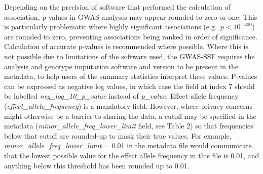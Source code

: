 \documentclass[11pt]{article}
\begin{document}
Depending on the precision of software that performed the calculation of association, p-values in GWAS analyses may appear rounded to zero or one. This is particularly problematic where highly significant associations (e.g.\ $p < 10^{-300}$) are rounded to zero, preventing associations being ranked in order of significance. Calculation of accurate p-values is recommended where possible. Where this is not possible due to limitations of the software used, the GWAS-SSF requires the analysis and genotype imputation software and version to be present in the metadata, to help users of the summary statistics interpret these values. P-values can be expressed as negative log values, in which case the field at index 7 should be labelled \textit{neg\_log\_10\_p\_value} instead of \textit{p\_value}. Effect allele frequency (\textit{effect\_allele\_frequency}) is a mandatory field. However, where privacy concerns might otherwise be a barrier to sharing the data, a cutoff may be specified in the metadata (\textit{minor\_allele\_freq\_lower\_limit} field, see Table 2) so that frequencies below that cutoff are rounded-up to mask their true values. For example, \textit{minor\_allele\_freq\_lower\_limit} = 0.01 in the metadata file would communicate that the lowest possible value for the effect allele frequency in this file is 0.01, and anything below this threshold has been rounded up to 0.01.
\end{document}
